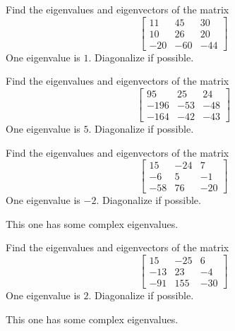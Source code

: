 \documentclass{ximera}
\begin{document}
\begin{problem}\label{prb:8.24} Find the eigenvalues and eigenvectors of the matrix
\begin{equation*}
\left[
\begin{array}{rrr}
11 & 45 & 30 \\
10 & 26 & 20 \\
-20 & -60 & -44
\end{array}
\right]
\end{equation*}
One eigenvalue is $1.$ Diagonalize if possible.
\end{problem}

\begin{problem}\label{prb:8.25} Find the eigenvalues and eigenvectors of the matrix
\begin{equation*}
\left[
\begin{array}{rrr}
95 & 25 & 24 \\
-196 & -53 & -48 \\
-164 & -42 & -43
\end{array}
\right]
\end{equation*}
One eigenvalue is $5.$ Diagonalize if possible.
\end{problem}

\begin{problem}\label{prb:8.28} Find the eigenvalues and eigenvectors of the matrix
\begin{equation*}
\left[
\begin{array}{rrr}
15 & -24 & 7 \\
-6 & 5 & -1 \\
-58 & 76 & -20
\end{array}
\right]
\end{equation*}
One eigenvalue is $-2. $ Diagonalize if possible. 
\begin{hint}
This one has some complex eigenvalues.
\end{hint}
\end{problem}

\begin{problem}\label{prb:8.29} Find the eigenvalues and eigenvectors of the matrix
\begin{equation*}
\left[
\begin{array}{rrr}
15 & -25 & 6 \\
-13 & 23 & -4 \\
-91 & 155 & -30
\end{array}
\right]
\end{equation*}
One eigenvalue is $2.$ Diagonalize if possible.  
\begin{hint}
This one has some complex eigenvalues.
\end{hint}
\end{problem}
\end{document}
